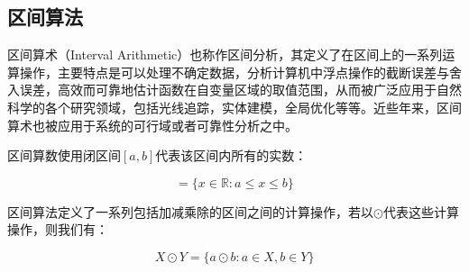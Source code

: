 \subsection{区间算法}

区间算术（Interval Arithmetic）也称作区间分析，其定义了在区间上的一系列运算操作，主要特点是可以处理不确定数据，分析计算机中浮点操作的截断误差与舍入误差，高效而可靠地估计函数在自变量区域的取值范围，从而被广泛应用于自然科学的各个研究领域，包括光线追踪，实体建模，全局优化等等。近些年来，区间算术也被应用于系统的可行域或者可靠性分析之中。

区间算数使用闭区间$[a, b]$代表该区间内所有的实数：

\begin{equation*}
    [a, b] = \{x \in \mathbb{R} : a \leq x \leq b \}
\end{equation*}

区间算法定义了一系列包括加减乘除的区间之间的计算操作，若以$\odot$代表这些计算操作，则我们有：

\begin{equation*}
    X \odot Y = \{ a \odot b : a \in X , b \in Y \}
\end{equation*}


